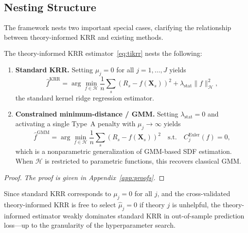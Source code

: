 \subsection{Nesting Structure}
\label{sub:nesting}

The framework nests two important special cases, clarifying
the relationship between theory-informed KRR and existing methods.

\begin{proposition}[Nesting]
\label{prop:nesting}
The theory-informed KRR estimator~\eqref{eq:tikrr} nests the following:
\begin{enumerate}[label=(\roman*)]
\item \textbf{Standard KRR.}
  Setting $\mu_j = 0$ for all $j = 1, \ldots, J$ yields
  \[
  \hat{f}^{\mathrm{KRR}} = \arg\min_{f \in \mathcal{H}}
  \frac{1}{n}\sum_s (R_s - f(\mathbf{X}_s))^2
  + \lambda_{\mathrm{stat}}\|f\|_{\mathcal{H}}^2,
  \]
  the standard kernel ridge regression estimator.

\item \textbf{Constrained minimum-distance / GMM.}
  Setting $\lambda_{\mathrm{stat}} = 0$ and activating a single
  Type~A penalty with $\mu_j \to \infty$ yields
  \[
  \hat{f}^{\mathrm{GMM}} = \arg\min_{f \in \mathcal{H}}
  \frac{1}{n}\sum_s (R_s - f(\mathbf{X}_s))^2
  \quad \text{s.t.} \quad
  C_j^{\mathrm{Euler}}(f) = 0,
  \]
  which is a nonparametric generalization of GMM-based SDF estimation.
  When $\mathcal{H}$ is restricted to parametric functions,
  this recovers classical GMM.
\end{enumerate}
\end{proposition}

\begin{proof}
\emph{The proof is given in Appendix~\ref{app:proofs}.}
\end{proof}

\begin{remark}
\label{rem:weak_dominance}
Since standard KRR corresponds to $\mu_j = 0$ for all $j$,
and the cross-validated theory-informed KRR is free to select
$\hat{\mu}_j = 0$ if theory $j$ is unhelpful, the theory-informed
estimator weakly dominates standard KRR in out-of-sample
prediction loss---up to the granularity of the hyperparameter search.
\end{remark}

